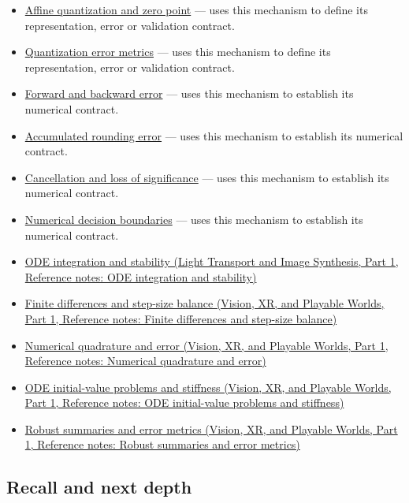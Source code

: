 \begin{itemize}
\item
  \hyperref[appendix-d5da3eaabaef]{Affine quantization and zero point} --- uses this mechanism to define its representation, error or validation contract.
\item
  \hyperref[appendix-537171d69d27]{Quantization error metrics} --- uses this mechanism to define its representation, error or validation contract.
\item
  \hyperref[appendix-a7fbaf6d1b1c]{Forward and backward error} --- uses this mechanism to establish its numerical contract.
\item
  \hyperref[appendix-f82e270791c8]{Accumulated rounding error} --- uses this mechanism to establish its numerical contract.
\item
  \hyperref[appendix-a2773a6a2f9d]{Cancellation and loss of significance} --- uses this mechanism to establish its numerical contract.
\item
  \hyperref[appendix-c80db39080be]{Numerical decision boundaries} --- uses this mechanism to establish its numerical contract.
\item
  \href{../04-Light-Transport-and-Image-Synthesis-P01/main.pdf\#appendix-18eacf61a04b}{ODE integration and stability (Light Transport and Image Synthesis, Part 1, Reference notes: ODE integration and stability)}
\item
  \href{../07-Vision-XR-and-Playable-Worlds-P01/main.pdf\#appendix-e2d7b4f2161d}{Finite differences and step-size balance (Vision, XR, and Playable Worlds, Part 1, Reference notes: Finite differences and step-size balance)}
\item
  \href{../07-Vision-XR-and-Playable-Worlds-P01/main.pdf\#appendix-80521eae6b71}{Numerical quadrature and error (Vision, XR, and Playable Worlds, Part 1, Reference notes: Numerical quadrature and error)}
\item
  \href{../07-Vision-XR-and-Playable-Worlds-P01/main.pdf\#appendix-e8ab9836882e}{ODE initial-value problems and stiffness (Vision, XR, and Playable Worlds, Part 1, Reference notes: ODE initial-value problems and stiffness)}
\item
  \href{../07-Vision-XR-and-Playable-Worlds-P01/main.pdf\#appendix-bcc44e9d3d02}{Robust summaries and error metrics (Vision, XR, and Playable Worlds, Part 1, Reference notes: Robust summaries and error metrics)}
\end{itemize}

\subsection{Recall and next depth}\label{appendix-3ae74e89b4e6-recall-and-next-depth}

